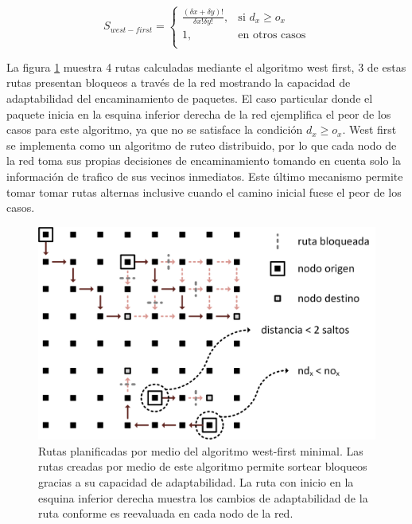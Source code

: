 \begin{equation}
	\label{eq:grado_wfm}
S_{west-first}=\begin{cases}
    		\frac{(\delta x+\delta y)!}{\delta x! \delta y!}, & \text{si $d_x \ge o_x$}	\\
    		1,  & \text{en otros casos}\\
		\end{cases}
\end{equation}

La figura \ref{fig:ch2_wf_example} muestra 4 rutas calculadas mediante el algoritmo west first, 3 de estas rutas presentan bloqueos a través de la red mostrando la capacidad de adaptabilidad del encaminamiento de paquetes. El caso particular donde el paquete inicia en la esquina inferior derecha de la red  ejemplifica el peor de los casos para este algoritmo, ya que no se satisface la condición $d_x \ge o_x$. West first se implementa como un algoritmo de ruteo distribuido, por lo que cada nodo de la red toma sus propias decisiones de encaminamiento tomando en cuenta solo la información de trafico de sus vecinos inmediatos. Este último mecanismo permite tomar tomar rutas alternas inclusive cuando el camino inicial fuese el peor de los casos.

\begin{figure}
	\begin{center}
		\includegraphics[scale=0.6]{figures/ch2_wf_example.png}
	\end{center}
	\caption
		{	
			Rutas planificadas por medio del algoritmo west-first minimal. Las rutas creadas por medio de este algoritmo permite sortear bloqueos gracias a su capacidad de adaptabilidad. La ruta con inicio en la esquina inferior derecha muestra los cambios de adaptabilidad de la ruta conforme es reevaluada en cada nodo de la red.
		}
	\label{fig:ch2_wf_example}
\end{figure}

